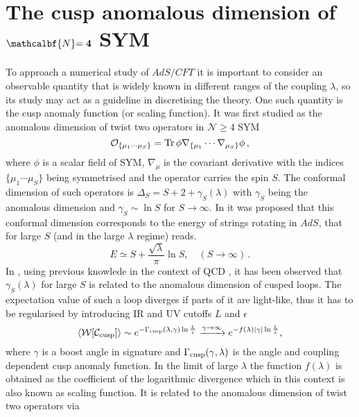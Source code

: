 \section[The cusp anomalous dimension of $\mathcal{N}=4$ SYM]{The cusp anomalous dimension of $\mathcalbf{N} \mathbf{=4}$ SYM}
%
%
To approach a numerical study of $AdS/CFT$ it is important to consider an observable quantity that is widely known in different ranges of the  coupling $\lambda$, so its study may act as a guideline in discretising the theory. One such quantity is the cusp anomaly function (or scaling function). It was first studied as the anomalous dimension of twist two operators in $\mathcal{N}\geq4$ SYM
%
%
\begin{equation}
\mathcal{O}_{\lbrace \mu_{1}\cdots\mu_{S}\rbrace} = {\rm Tr}\, \phi \nabla_{\lbrace\mu_{1}} \cdots \nabla_{\mu_{S}\rbrace} \phi\,,
\end{equation}
%
%
where $\phi$ is a scalar field of SYM, $\nabla_{\mu}$ is the covariant derivative with the indices $\lbrace \mu_{1} \cdots \mu_{S}\rbrace$ being symmetrised and the operator carries the spin $S$. The conformal dimension of such operators is $\Delta_{S} = S +2 + \gamma_{S}(\lambda)$ with $\gamma_{S}$ being the anomalous dimension and $\gamma_{S} \sim \ln S$ for $S \to \infty$. In \cite{Gubser:2002tv} it was proposed that this conformal dimension corresponds to the energy of strings rotating in $AdS$, that for large $S$ (and in the large $\lambda$ regime) reads.
%
%
\begin{equation}
E \simeq S + \frac{\sqrt{\lambda}}{\pi} \ln S , \quad  (S \to \infty)\,.
\end{equation}
%
%
In \cite{Kruczenski:2002fb}, using previous knowlede in the context of QCD \cite{Korchemsky:1992xv}, it has been observed that $\gamma_{S}(\lambda)$ for large $S$ is related to the anomalous dimension of cusped  loops. The expectation value of such a  loop diverges if parts of it are light-like, thus it has to be regularised by introducing IR and UV cutoffs $L$ and $\epsilon$
%
%
\begin{equation}
\langle \mathcal{W}[\mathcal{C_{\rm cusp}}] \rangle \sim e^{-\Gamma_{\rm cusp}(\lambda,\gamma) \ln\frac{L}{\epsilon}}  \xrightarrow{\gamma \to \infty} e^{-f(\lambda)\vert \gamma\vert \ln \frac{L}{\epsilon}},
\label{W_f}
\end{equation}
%
%
where $\gamma$ is a boost angle in  signature and $\Gamma_{\rm cusp}(\gamma,\lambda)$ is the angle and coupling dependent cusp anomaly function. In the limit of large $\lambda$ the function $f(\lambda)$ is obtained as the coefficient of the logarithmic divergence  which in this context is also known as scaling function. It is related to the anomalous dimension of twist two operators via \cite{Kruczenski:2002fb}
